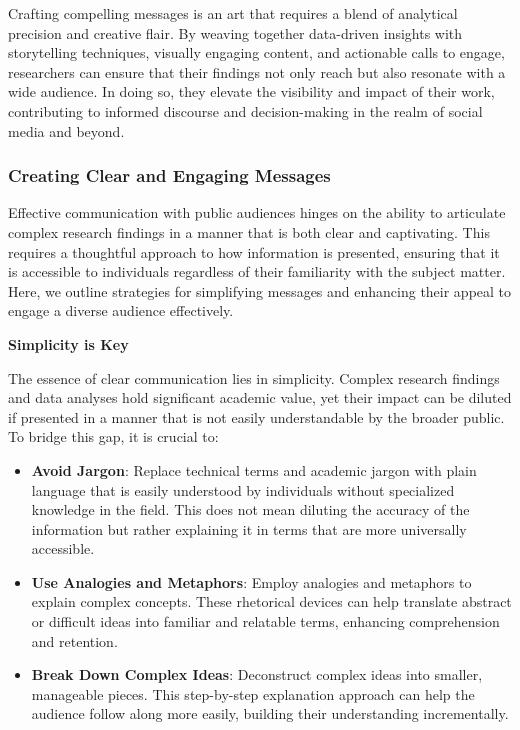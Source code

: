 \documentclass[
]{book}
\begin{document}
Crafting compelling messages is an art that requires a blend of analytical precision and creative flair. By weaving together data-driven insights with storytelling techniques, visually engaging content, and actionable calls to engage, researchers can ensure that their findings not only reach but also resonate with a wide audience. In doing so, they elevate the visibility and impact of their work, contributing to informed discourse and decision-making in the realm of social media and beyond.

\hypertarget{creating-clear-and-engaging-messages}{%
\subsubsection*{Creating Clear and Engaging Messages}\label{creating-clear-and-engaging-messages}}

Effective communication with public audiences hinges on the ability to articulate complex research findings in a manner that is both clear and captivating. This requires a thoughtful approach to how information is presented, ensuring that it is accessible to individuals regardless of their familiarity with the subject matter. Here, we outline strategies for simplifying messages and enhancing their appeal to engage a diverse audience effectively.

\textbf{Simplicity is Key}

The essence of clear communication lies in simplicity. Complex research findings and data analyses hold significant academic value, yet their impact can be diluted if presented in a manner that is not easily understandable by the broader public. To bridge this gap, it is crucial to:

\begin{itemize}
\item
  \textbf{Avoid Jargon}: Replace technical terms and academic jargon with plain language that is easily understood by individuals without specialized knowledge in the field. This does not mean diluting the accuracy of the information but rather explaining it in terms that are more universally accessible.
\item
  \textbf{Use Analogies and Metaphors}: Employ analogies and metaphors to explain complex concepts. These rhetorical devices can help translate abstract or difficult ideas into familiar and relatable terms, enhancing comprehension and retention.
\item
  \textbf{Break Down Complex Ideas}: Deconstruct complex ideas into smaller, manageable pieces. This step-by-step explanation approach can help the audience follow along more easily, building their understanding incrementally.
\end{itemize}
\end{document}
